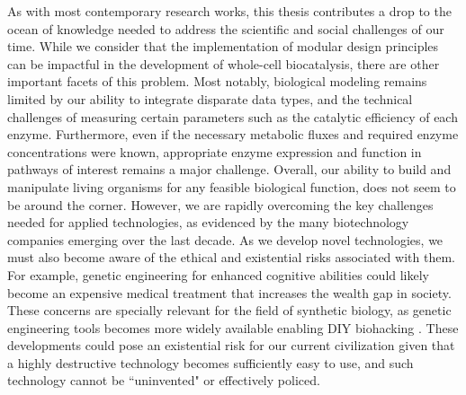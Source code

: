 As with most contemporary research works, this thesis contributes a drop to the ocean of knowledge needed to address the scientific and social challenges of our time.
While we consider that the implementation of modular design principles can be impactful in the development of whole-cell biocatalysis, there are other important facets of this problem.
Most notably, biological modeling remains limited by our ability to integrate disparate data types, and the technical challenges of measuring certain parameters such as the catalytic efficiency of each enzyme.
Furthermore, even if the necessary metabolic fluxes and required enzyme concentrations were known, appropriate enzyme expression and function in pathways of interest remains a major challenge.
Overall, our ability to build and manipulate living organisms for any feasible biological function, does not seem to be around the corner.
However, we are rapidly overcoming the key challenges needed for applied technologies, as evidenced by the many biotechnology companies emerging over the last decade.
As we develop novel technologies, we must also become aware of the ethical and existential risks associated with them.
For example, genetic engineering for enhanced cognitive abilities could likely become an expensive medical treatment that increases the wealth gap in society. %
These concerns are specially relevant for the field of synthetic biology, as genetic engineering tools becomes more widely available enabling DIY biohacking \citep{bennett2009}.
These developments could pose an existential risk for our current civilization given that a highly destructive technology becomes sufficiently easy to use,  and such technology cannot be ``uninvented" or effectively policed.
